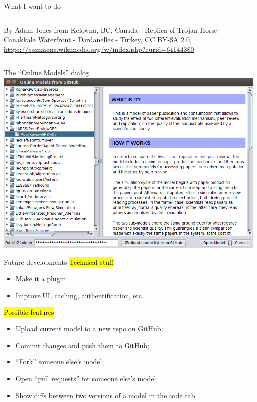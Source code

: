 \documentclass{beamer}
\begin{document}
\begin{frame}{What I want to do}
\begin{columns}
\begin{column}{0.5\textwidth}
\begin{center}
        {\tiny \textcolor{black!50}{By Adam Jones from Kelowna, BC, Canada - Replica of Trojan Horse - Canakkale Waterfront - Dardanelles - Turkey, CC BY-SA 2.0, \url{https://commons.wikimedia.org/w/index.php?curid=64144380}}\par}
      \end{center}
    \end{column}
  \end{columns}

\end{frame}

\begin{frame}{The ``Online Models'' dialog}
  \includegraphics[width=\textwidth]{Screenshot}
\end{frame}

\begin{frame}{Future developments}\large
  \hl{\larger Technical stuff}

  \begin{itemize}
    \item Make it a plugin
    \item Improve UI, caching, authentification, etc.
  \end{itemize}
  \pause
  \vfill
  \hl{\larger Possible features}

  \begin{itemize}
    \item Upload current model to a new repo on GitHub;
    \item Commit changes and push them to GitHub;
    \item ``Fork'' someone else's model;
    \item Open ``pull requests'' for someone else's model;
    \item Show diffs between two versions of a model in the code tab.
  \end{itemize}
\end{frame}
\end{document}

